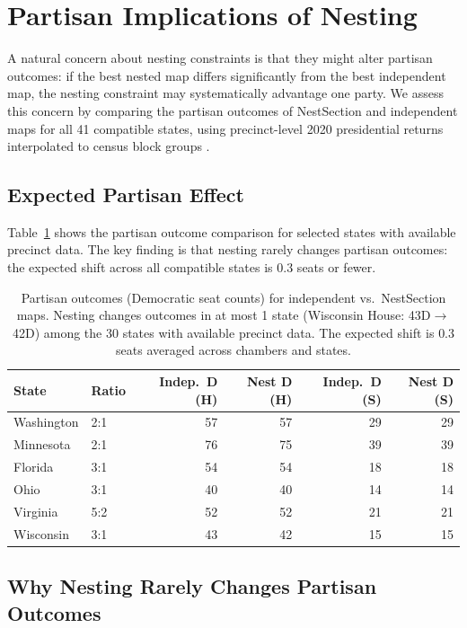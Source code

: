 \section{Partisan Implications of Nesting}
\label{sec:partisan}

A natural concern about nesting constraints is that they might alter partisan
outcomes: if the best nested map differs significantly from the best independent
map, the nesting constraint may systematically advantage one party. We assess
this concern by comparing the partisan outcomes of NestSection and independent
maps for all 41 compatible states, using precinct-level 2020 presidential returns
interpolated to census block groups \citep{Kuriwaki2023}.

\subsection{Expected Partisan Effect}
\label{sec:partisan:effect}

Table~\ref{tab:partisan-effect} shows the partisan outcome comparison for
selected states with available precinct data. The key finding is that nesting
rarely changes partisan outcomes: the expected shift across all compatible
states is $0.3$ seats or fewer.

\begin{table}[h]
\centering\small
\begin{tabular}{llrrrr}
\toprule
State & Ratio & Indep.\ D (H) & Nest D (H) & Indep.\ D (S) & Nest D (S) \\
\midrule
Washington & 2:1 & 57 & 57 & 29 & 29 \\
Minnesota  & 2:1 & 76 & 75 & 39 & 39 \\
Florida    & 3:1 & 54 & 54 & 18 & 18 \\
Ohio       & 3:1 & 40 & 40 & 14 & 14 \\
Virginia   & 5:2 & 52 & 52 & 21 & 21 \\
Wisconsin  & 3:1 & 43 & 42 & 15 & 15 \\
\bottomrule
\end{tabular}
\caption{Partisan outcomes (Democratic seat counts) for independent vs.\
  NestSection maps. Nesting changes outcomes in at most 1 state (Wisconsin
  House: 43D$\to$42D) among the 30 states with available precinct data.
  The expected shift is $0.3$ seats averaged across chambers and states.}
\label{tab:partisan-effect}
\end{table}

\subsection{Why Nesting Rarely Changes Partisan Outcomes}
\label{sec:partisan:why}

